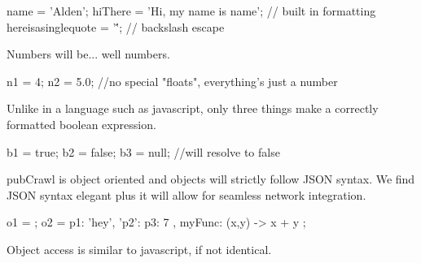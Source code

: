 \documentclass[letterpaper]{article}
\begin{document}
\begin{mdframed}[hidealllines=true,backgroundcolor=gray!10,skipbelow=1em,skipabove=.5em]
\begin{code}
name = 'Alden';
hiThere = 'Hi, my name is {{name}}'; // built in formatting
hereisasinglequote = '\''; // backslash escape
\end{code}
\end{mdframed} 
Numbers will be... well numbers.
\begin{mdframed}[hidealllines=true,backgroundcolor=gray!10,skipbelow=1em,skipabove=.5em]
\begin{code}
n1 = 4;  
n2 = 5.0; //no special "floats", everything's just a number
\end{code}
\end{mdframed}
Unlike in a language such as javascript, only three things make a correctly formatted boolean expression.
\begin{mdframed}[hidealllines=true,backgroundcolor=gray!10,skipbelow=1em,skipabove=.5em]
\begin{code}
b1 = true;
b2 = false;
b3 = null; //will resolve to false
\end{code}
\end{mdframed}
pubCrawl is object oriented and objects will strictly follow JSON syntax. We find JSON syntax elegant plus it will allow for seamless network integration.
\begin{mdframed}[hidealllines=true,backgroundcolor=gray!10,skipbelow=1em,skipabove=.5em]
\begin{code}
o1 = {}; 
o2 = {
	p1: 'hey',
	'p2': {
		p3: 7
	},
	myFunc: (x,y) -> x + y
};
\end{code}
\end{mdframed}
Object access is similar to javascript, if not identical.
\end{document}
